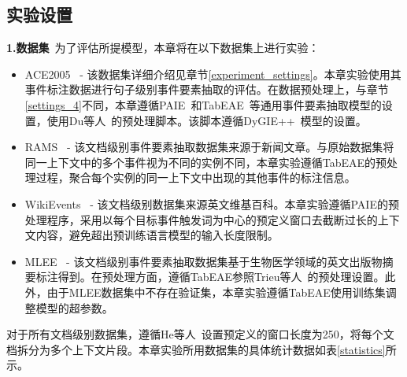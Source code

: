 \subsection{实验设置}
\textbf{1.数据集}~为了评估所提模型，本章将在以下数据集上进行实验：
\begin{itemize}
\item ACE2005~\cite{doddington2004automatic} - 该数据集详细介绍见章节\ref{experiment_settings}。本章实验使用其事件标注数据进行句子级别事件要素抽取的评估。在数据预处理上，与章节\ref{settings_4}不同，本章遵循PAIE~\cite{ma2022prompt}和TabEAE~\cite{he2023revisiting}等通用事件要素抽取模型的设置，使用Du等人~\cite{du2020event}的预处理脚本。该脚本遵循DyGIE++~\cite{wadden2019entity}模型的设置。

\item RAMS~\cite{ebner2020multi} - 该文档级别事件要素抽取数据集来源于新闻文章。与原始数据集将同一上下文中的多个事件视为不同的实例不同，本章实验遵循TabEAE的预处理过程，聚合每个实例的同一上下文中出现的其他事件的标注信息。

\item WikiEvents~\cite{li2021document} - 该文档级别数据集来源英文维基百科。本章实验遵循PAIE的预处理程序，采用以每个目标事件触发词为中心的预定义窗口去截断过长的上下文内容，避免超出预训练语言模型的输入长度限制。

\item MLEE~\cite{pyysalo2012event} - 该文档级别事件要素抽取数据集基于生物医学领域的英文出版物摘要标注得到。在预处理方面，遵循TabEAE参照Trieu等人~\cite{trieu2020deepeventmine}的预处理设置。此外，由于MLEE数据集中不存在验证集，本章实验遵循TabEAE使用训练集调整模型的超参数。    
\end{itemize}

对于所有文档级别数据集，遵循He等人~\cite{he2023revisiting}设置预定义的窗口长度为250，将每个文档拆分为多个上下文片段。本章实验所用数据集的具体统计数据如表\ref{statistics}所示。

